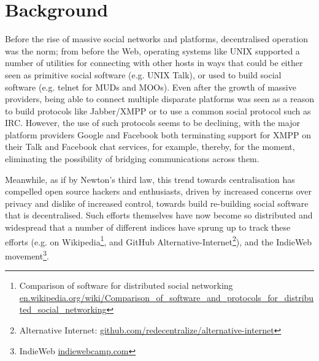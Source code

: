 \documentclass{sig-alternate}
\begin{document}

\section{Background}

Before the rise of massive social networks and platforms, decentralised operation was the norm; from before the Web, operating systems like UNIX supported a number of utilities for connecting with other hosts in ways that could be either seen as primitive social software (e.g. UNIX Talk), or used to build social software (e.g. telnet for MUDs and MOOs). Even after the growth of massive providers, being able to connect multiple disparate platforms was seen as a reason to build protocols like Jabber/XMPP\cite{saint2005streaming} or to use a common social protocol such as IRC.  However, the use of such protocols seems to be declining, with the major platform providers Google and Facebook both terminating support for XMPP on their Talk and Facebook chat services, for example, thereby, for the moment, eliminating the possibility of bridging communications across them.

Meanwhile, as if by Newton's third law, this trend towards centralisation has compelled open source hackers and enthusiasts, driven by increased concerns over privacy and dislike of increased control, towards build re-building social software that is decentralised.  Such efforts themselves have now become so distributed and widespread that a number of different indices have sprung up to track these efforts (e.g. on Wikipedia\footnote{Comparison of software for distributed social networking \url{en.wikipedia.org/wiki/Comparison_of_software_and_protocols_for_distributed_social_networking}}, and GitHub Alternative-Internet\footnote{Alternative Internet: \url{github.com/redecentralize/alternative-internet}}), and the IndieWeb movement\footnote{IndieWeb \url{indiewebcamp.com}}. 
\end{document}
